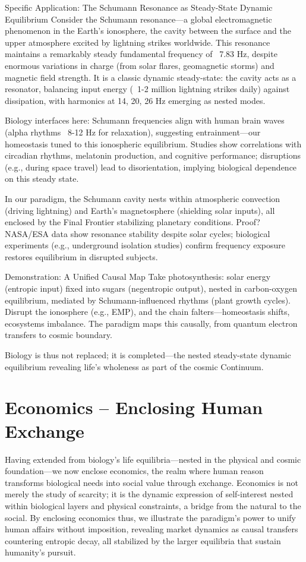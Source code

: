 Specific Application: The Schumann Resonance as Steady-State Dynamic Equilibrium  
Consider the Schumann resonance—a global electromagnetic phenomenon in the Earth’s ionosphere, the cavity between the surface and the upper atmosphere excited by lightning strikes worldwide. This resonance maintains a remarkably steady fundamental frequency of ~7.83 Hz, despite enormous variations in charge (from solar flares, geomagnetic storms) and magnetic field strength. It is a classic dynamic steady-state: the cavity acts as a resonator, balancing input energy (~1-2 million lightning strikes daily) against dissipation, with harmonics at 14, 20, 26 Hz emerging as nested modes.

Biology interfaces here: Schumann frequencies align with human brain waves (alpha rhythms ~8-12 Hz for relaxation), suggesting entrainment—our homeostasis tuned to this ionospheric equilibrium. Studies show correlations with circadian rhythms, melatonin production, and cognitive performance; disruptions (e.g., during space travel) lead to disorientation, implying biological dependence on this steady state.

In our paradigm, the Schumann cavity nests within atmospheric convection (driving lightning) and Earth’s magnetosphere (shielding solar inputs), all enclosed by the Final Frontier stabilizing planetary conditions. Proof? NASA/ESA data show resonance stability despite solar cycles; biological experiments (e.g., underground isolation studies) confirm frequency exposure restores equilibrium in disrupted subjects.

Demonstration: A Unified Causal Map  
Take photosynthesis: solar energy (entropic input) fixed into sugars (negentropic output), nested in carbon-oxygen equilibrium, mediated by Schumann-influenced rhythms (plant growth cycles). Disrupt the ionosphere (e.g., EMP), and the chain falters—homeostasis shifts, ecosystems imbalance. The paradigm maps this causally, from quantum electron transfers to cosmic boundary.

Biology is thus not replaced; it is completed—the nested steady-state dynamic equilibrium revealing life’s wholeness as part of the cosmic Continuum.

\chapter{Economics – Enclosing Human Exchange}

Having extended from biology’s life equilibria—nested in the physical and cosmic foundation—we now enclose economics, the realm where human reason transforms biological needs into social value through exchange. Economics is not merely the study of scarcity; it is the dynamic expression of self-interest nested within biological layers and physical constraints, a bridge from the natural to the social. By enclosing economics thus, we illustrate the paradigm’s power to unify human affairs without imposition, revealing market dynamics as causal transfers countering entropic decay, all stabilized by the larger equilibria that sustain humanity’s pursuit.

